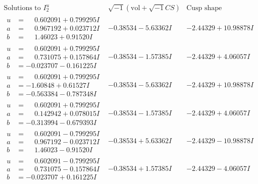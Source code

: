 \documentclass[1p]{elsarticle_modified}
\theoremstyle{definition}
\newcommand{\I}{\sqrt{-1}}
\begin{document}
$$\begin{array}{c|c|c}  
\text{Solutions to }I^u_{2}& \I (\text{vol} + \sqrt{-1}CS) & \text{Cusp shape}\\
 \hline 
\begin{aligned}
u &= \phantom{-}0.602091 + 0.799295 I \\
a &= \phantom{-}0.967192 + 0.023712 I \\
b &= \phantom{-}1.46023 + 0.91520 I\end{aligned}
 & -0.38534 - 5.63362 I & -2.44329 + 10.98878 I \\ \hline\begin{aligned}
u &= \phantom{-}0.602091 + 0.799295 I \\
a &= \phantom{-}0.731075 + 0.157864 I \\
b &= -0.023707 - 0.161225 I\end{aligned}
 & -0.38534 - 1.57385 I & -2.44329 + 4.06057 I \\ \hline\begin{aligned}
u &= \phantom{-}0.602091 + 0.799295 I \\
a &= -1.60848 + 0.61527 I \\
b &= -0.563384 - 0.787348 I\end{aligned}
 & -0.38534 - 5.63362 I & -2.44329 + 10.98878 I \\ \hline\begin{aligned}
u &= \phantom{-}0.602091 + 0.799295 I \\
a &= \phantom{-}0.142942 + 0.078015 I \\
b &= -0.313994 - 0.679393 I\end{aligned}
 & -0.38534 - 1.57385 I & -2.44329 + 4.06057 I \\ \hline\begin{aligned}
u &= \phantom{-}0.602091 - 0.799295 I \\
a &= \phantom{-}0.967192 - 0.023712 I \\
b &= \phantom{-}1.46023 - 0.91520 I\end{aligned}
 & -0.38534 + 5.63362 I & -2.44329 - 10.98878 I \\ \hline\begin{aligned}
u &= \phantom{-}0.602091 - 0.799295 I \\
a &= \phantom{-}0.731075 - 0.157864 I \\
b &= -0.023707 + 0.161225 I\end{aligned}
 & -0.38534 + 1.57385 I & -2.44329 - 4.06057 I \\ \hline\begin{aligned}

\end{aligned}
\end{array}$$
\end{document}
